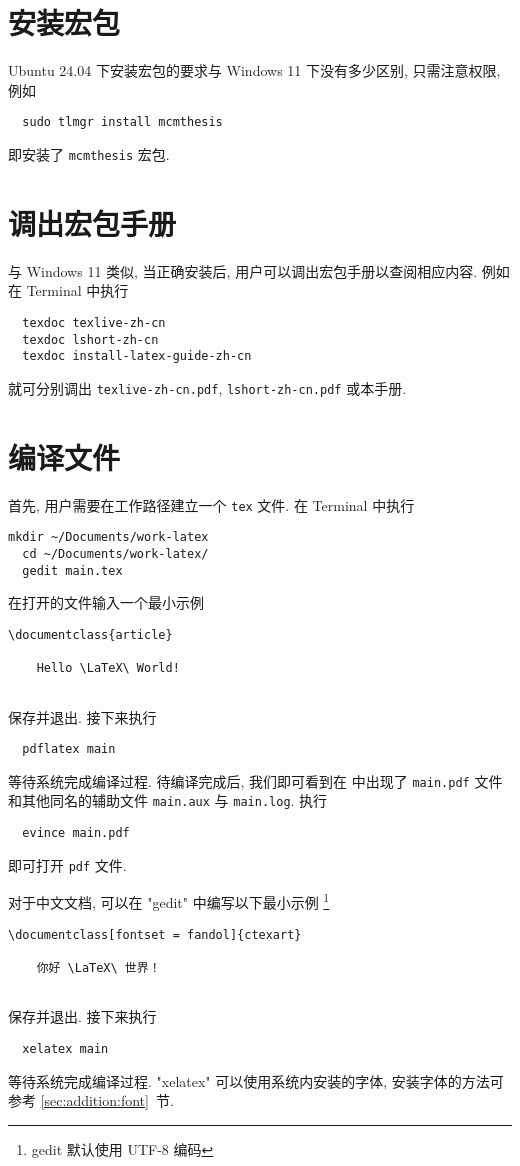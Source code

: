 \section{安装宏包}\label{sec:ubuntu:installpackage}

Ubuntu 24.04 下安装宏包的要求与 Windows 11 下没有多少区别, 只需注意权限, 例如
\begin{lstlisting}
  sudo tlmgr install mcmthesis
\end{lstlisting}
即安装了 \texttt{mcmthesis} 宏包.

\section{调出宏包手册}\label{sec:ubuntu:texdoc}

与 Windows 11 类似,
当正确安装后,
用户可以调出宏包手册以查阅相应内容.
例如在 \textsf{Terminal} 中执行
\begin{lstlisting}
  texdoc texlive-zh-cn
  texdoc lshort-zh-cn
  texdoc install-latex-guide-zh-cn
\end{lstlisting}
就可分别调出 \texttt{texlive-zh-cn.pdf},
\texttt{lshort-zh-cn.pdf}
或本手册.

\section{编译文件}

首先, 用户需要在工作路径建立一个 \texttt{tex} 文件.
在 \textsf{Terminal} 中执行
\begin{lstlisting}[deletekeywords = tex]
  mkdir ~/Documents/work-latex
  cd ~/Documents/work-latex/
  gedit main.tex
\end{lstlisting}
在打开的文件输入一个最小示例
\begin{lstlisting}[language = mwe]
  \documentclass{article}
  
    Hello \LaTeX\ World!
  
\end{lstlisting}
保存并退出.
接下来执行
\begin{lstlisting}
  pdflatex main
\end{lstlisting}
等待系统完成编译过程.
待编译完成后,
我们即可看到在  中出现了
\texttt{main.pdf} 文件和其他同名的辅助文件 \texttt{main.aux} 与
\texttt{main.log}.
执行
\begin{lstlisting}
  evince main.pdf
\end{lstlisting}
即可打开 \texttt{pdf} 文件.

对于中文文档, 可以在 "gedit" 中编写以下最小示例%
\footnote{gedit 默认使用 UTF-8 编码}%
\begin{lstlisting}[language = mwe]
  \documentclass[fontset = fandol]{ctexart}
  
    你好 \LaTeX\ 世界！
  
\end{lstlisting}
保存并退出.
接下来执行
\begin{lstlisting}
  xelatex main
\end{lstlisting}
等待系统完成编译过程.
"xelatex" 可以使用系统内安装的字体,
安装字体的方法可参考 \ref{sec:addition:font}~节.

